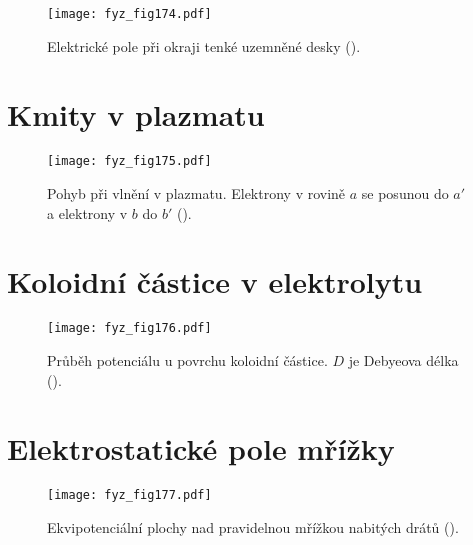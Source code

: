   \begin{figure}[ht!]  %
    \centering
    \texttt{[image: fyz\_fig174.pdf]}
    \caption{Elektrické pole při okraji tenké uzemněné desky
             (\cite[s.~128]{Feynman02}).}
    \label{fyz:fig174}
  \end{figure}
  
\section{Kmity v plazmatu}\label{fyz:IIchapVsecXXIV}

  \begin{figure}[ht!]  %
    \centering
    \texttt{[image: fyz\_fig175.pdf]}
    \caption{Pohyb při vlnění v plazmatu. Elektrony v rovině \(a\) se posunou do \(a'\) a 
             elektrony v \(b\) do \(b'\)
             (\cite[s.~130]{Feynman02}).}
    \label{fyz:fig175}
  \end{figure}
  
\section{Koloidní částice v elektrolytu}\label{fyz:IIchapVsecXXV}

  \begin{figure}[ht!]  %
    \centering
    \texttt{[image: fyz\_fig176.pdf]}
    \caption{Průběh potenciálu u povrchu koloidní částice. \(D\) je Debyeova délka
             (\cite[s.~134]{Feynman02}).}
    \label{fyz:fig176}
  \end{figure}
  
\section{Elektrostatické pole mřížky}\label{fyz:IIchapVsecXXVI}

  \begin{figure}[ht!]  %
    \centering
    \texttt{[image: fyz\_fig177.pdf]}
    \caption{Ekvipotenciální plochy nad pravidelnou mřížkou nabitých drátů
             (\cite[s.~136]{Feynman02}).}
    \label{fyz:fig177}
  \end{figure}
  
\printbibliography[title={Seznam literatury}, heading=subbibliography]
